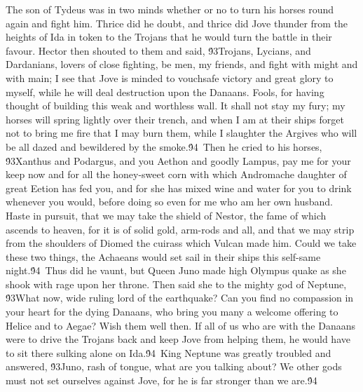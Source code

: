 {The son of Tydeus was in two minds whether or no to turn his horses round again and fight him. Thrice did he doubt, and thrice did Jove thunder from the heights of Ida in token to the Trojans that he would turn the battle in their favour. Hector then shouted to them and said, \'93Trojans, Lycians, and Dardanians, lovers of close fighting, be men, my friends, and fight with might and with main; I see that Jove is minded to vouchsafe victory and great glory to myself, while he will deal destruction upon the Danaans. Fools, for having thought of building this weak and worthless wall. It shall not stay my fury; my horses will spring lightly over their trench, and when I am at their ships forget not to bring me fire that I may burn them, while I slaughter the Argives who will be all dazed and bewildered by the smoke.\'94\
Then he cried to his horses, \'93Xanthus and Podargus, and you Aethon and goodly Lampus, pay me for your keep now and for all the honey-sweet corn with which Andromache daughter of great Eetion has fed you, and for she has mixed wine and water for you to drink whenever you would, before doing so even for me who am her own husband. Haste in pursuit, that we may take the shield of Nestor, the fame of which ascends to heaven, for it is of solid gold, arm-rods and all, and that we may strip from the shoulders of Diomed the cuirass which Vulcan made him. Could we take these two things, the Achaeans would set sail in their ships this self-same night.\'94\
Thus did he vaunt, but Queen Juno made high Olympus quake as she shook with rage upon her throne. Then said she to the mighty god of Neptune, \'93What now, wide ruling lord of the earthquake? Can you find no compassion in your heart for the dying Danaans, who bring you many a welcome offering to Helice and to Aegae? Wish them well then. If all of us who are with the Danaans were to drive the Trojans back and keep Jove from helping them, he would have to sit there sulking alone on Ida.\'94\
King Neptune was greatly troubled and answered, \'93Juno, rash of tongue, what are you talking about? We other gods must not set ourselves against Jove, for he is far stronger than we are.\'94\
}
